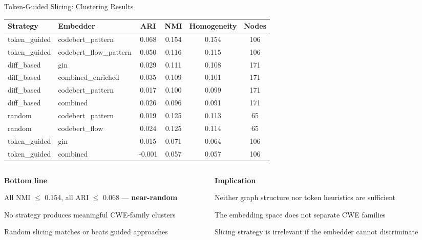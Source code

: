 \documentclass[aspectratio=169,10pt]{beamer}
\newcommand{\chit}[1]{\cellcolor{hit!30} #1}
\begin{document}
\begin{frame}{Token-Guided Slicing: Clustering Results}

  \centering
  \vspace{0.1em}
  {\scriptsize
  \renewcommand{\arraystretch}{1.25}
  \setlength{\tabcolsep}{3pt}
  \begin{tabular}{l l *{3}{c} c}
    \toprule
    \textbf{Strategy} & \textbf{Embedder} & \textbf{ARI} & \textbf{NMI} & \textbf{Homogeneity} & \textbf{Nodes} \\
    \midrule
    \rowcolor{c1!10}
    token\_guided & codebert\_pattern & \chit{0.068} & \chit{0.154} & \chit{0.154} & 106 \\
    token\_guided & codebert\_flow\_pattern & 0.050 & 0.116 & 0.115 & 106 \\
    diff\_based & gin & 0.029 & 0.111 & 0.108 & 171 \\
    diff\_based & combined\_enriched & 0.035 & 0.109 & 0.101 & 171 \\
    diff\_based & codebert\_pattern & 0.017 & 0.100 & 0.099 & 171 \\
    diff\_based & combined & 0.026 & 0.096 & 0.091 & 171 \\
    random & codebert\_pattern & 0.019 & 0.125 & 0.113 & 65 \\
    random & codebert\_flow & 0.024 & 0.125 & 0.114 & 65 \\
    token\_guided & gin & 0.015 & 0.071 & 0.064 & 106 \\
    token\_guided & combined & -0.001 & 0.057 & 0.057 & 106 \\
    \bottomrule
  \end{tabular}}

  \vspace{0.4em}
  \begin{columns}[T]
  \begin{column}{0.48\textwidth}
    {\scriptsize\textbf{\textcolor{miss}{Bottom line}}}
    \begin{itemize}\itemsep1pt
      {\scriptsize
      \item All NMI $\leq$ 0.154, all ARI $\leq$ 0.068 — \textbf{near-random}
      \item No strategy produces meaningful CWE-family clusters
      \item Random slicing matches or beats guided approaches}
    \end{itemize}
  \end{column}
  \begin{column}{0.48\textwidth}
    {\scriptsize\textbf{\textcolor{warn}{Implication}}}
    \begin{itemize}\itemsep1pt
      {\scriptsize
      \item Neither graph structure nor token heuristics are sufficient
      \item The embedding space does not separate CWE families
      \item Slicing strategy is irrelevant if the embedder cannot discriminate}
    \end{itemize}
  \end{column}
  \end{columns}
\end{frame}
\end{document}
